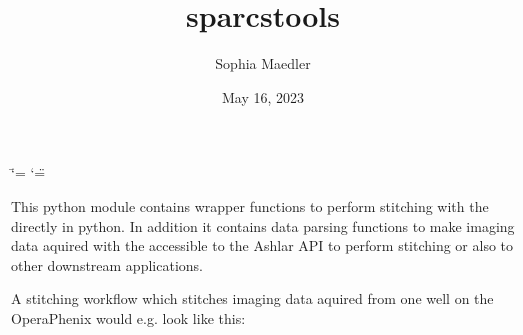 \documentclass[a4paper,10pt,english,openany,oneside]{sphinxmanual}
\title{sparcstools}
\date{May 16, 2023}
\author{Sophia Maedler}
\begin{document}
\ifdefined\shorthandoff
  \ifnum\catcode`\=\string=\active\shorthandoff{=}\fi
  \ifnum\catcode`\"=\active{}\fi
\fi

\pagestyle{empty}
\sphinxmaketitle
\pagestyle{plain}
\sphinxtableofcontents
\pagestyle{normal}
\label{\detokenize{index::doc}}


\sphinxAtStartPar
This python module contains wrapper functions to perform stitching with the  directly in python. In addition it contains
data parsing functions to make imaging data aquired with the  accessible to the Ashlar API to perform stitching
or also to other downstream applications.

\sphinxAtStartPar
A stitching workflow which stitches imaging data aquired from one well on the OperaPhenix would e.g. look like this:
\end{document}
